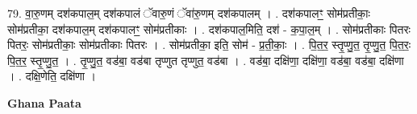 \documentclass[17pt]{extarticle}
\begin{document}
79. वा॒रु॒णम् दश॑कपाल॒म् दश॑कपालं ॅवारु॒णं ॅवा॑रु॒णम् दश॑कपालम् । . दश॑कपालꣳ॒॒ सोम॑प्रतीकाः॒ सोम॑प्रतीका॒ दश॑कपाल॒म् दश॑कपालꣳ॒॒ सोम॑प्रतीकाः । . दश॑कपाल॒मिति॒ दश॑ - क॒पा॒ल॒म् । . सोम॑प्रतीकाः पितरः पितरः॒ सोम॑प्रतीकाः॒ सोम॑प्रतीकाः पितरः । . सोम॑प्रतीका॒ इति॒ सोम॑ - प्र॒ती॒काः॒ । . पि॒त॒र॒ स्तृ॒प्णु॒त॒ तृ॒प्णु॒त॒ पि॒त॒रः॒ पि॒त॒र॒ स्तृ॒प्णु॒त॒ । . तृ॒प्णु॒त॒ वड॑बा॒ वड॑बा तृप्णुत तृप्णुत॒ वड॑बा । . वड॑बा॒ दक्षि॑णा॒ दक्षि॑णा॒ वड॑बा॒ वड॑बा॒ दक्षि॑णा । . दक्षि॒णेति॒ दक्षि॑णा । \newline

\textbf{Ghana Paata } \newline
\end{document}

